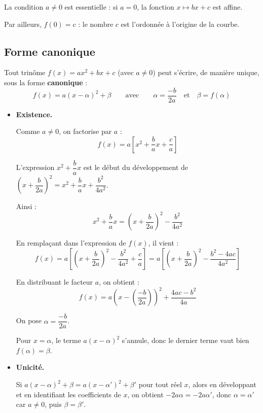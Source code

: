 \begin{rem}
	La condition $a \neq 0$ est essentielle : si $a = 0$, la fonction $x \mapsto bx + c$ est affine.

	Par ailleurs, $f(0) = c$ : le nombre $c$ est l'ordonnée à l'origine de la courbe.
\end{rem}

\subsection{Forme canonique}

\begin{thm}
	Tout trinôme $f(x) = ax^2 + bx + c$ (avec $a \neq 0$) peut s'écrire, de manière unique, sous la forme \textbf{canonique} :
	\[
		f(x) = a(x - \alpha)^2 + \beta
		\qquad \text{avec} \qquad
		\alpha = \frac{-b}{2a} \quad \text{et} \quad \beta = f(\alpha)
	\]
\end{thm}

\newpage

\begin{demo}
	\nline
	\begin{itemize}
		\item \textbf{Existence.}

		      Comme $a \neq 0$, on factorise par $a$ :
		      \[
			      f(x) = a \left[ x^2 + \frac{b}{a}x + \frac{c}{a} \right]
		      \]

		      L'expression $x^2 + \dfrac{b}{a}x$ est le début du développement de $\left(x + \dfrac{b}{2a}\right)^2 = x^2 + \dfrac{b}{a}x + \dfrac{b^2}{4a^2}$.

		      Ainsi :
		      \[
			      x^2 + \frac{b}{a}x = \left(x + \frac{b}{2a}\right)^2 - \frac{b^2}{4a^2}
		      \]

		      En remplaçant dans l'expression de $f(x)$, il vient :
		      \[
			      f(x) = a \left[ \left(x + \frac{b}{2a}\right)^2 - \frac{b^2}{4a^2} + \frac{c}{a} \right]
			      = a \left[ \left(x + \frac{b}{2a}\right)^2 - \frac{b^2 - 4ac}{4a^2} \right]
		      \]

		      En distribuant le facteur $a$, on obtient :
		      \[
			      f(x) = a\left(x - \left(\frac{-b}{2a}\right)\right)^2 + \frac{4ac - b^2}{4a}
		      \]

		      On pose $\alpha = \dfrac{-b}{2a}$.

		      Pour $x = \alpha$, le terme $a(x-\alpha)^2$ s'annule, donc le dernier terme vaut bien $f(\alpha) = \beta$.

		\item \textbf{Unicité.}

		      Si $a(x-\alpha)^2 + \beta = a(x-\alpha')^2 + \beta'$ pour tout réel $x$, alors en développant et en identifiant les coefficients de $x$, on obtient $-2a\alpha = -2a\alpha'$, donc $\alpha = \alpha'$ car $a \neq 0$, puis $\beta = \beta'$.
	\end{itemize}
\end{demo}

